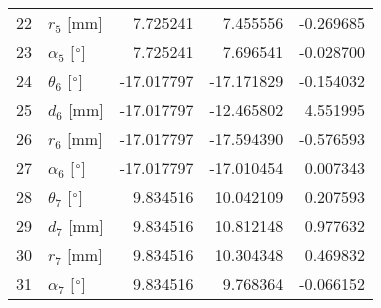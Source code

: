 \documentclass{standalone}%
\begin{document}
\begin{tabular}{llrrr}
22 &              $r_{5}$ [mm] &   7.725241 &   7.455556 &  -0.269685 \\
23 &  $\alpha_{5}$ [$\degree$] &   7.725241 &   7.696541 &  -0.028700 \\
24 &  $\theta_{6}$ [$\degree$] & -17.017797 & -17.171829 &  -0.154032 \\
25 &              $d_{6}$ [mm] & -17.017797 & -12.465802 &   4.551995 \\
26 &              $r_{6}$ [mm] & -17.017797 & -17.594390 &  -0.576593 \\
27 &  $\alpha_{6}$ [$\degree$] & -17.017797 & -17.010454 &   0.007343 \\
28 &  $\theta_{7}$ [$\degree$] &   9.834516 &  10.042109 &   0.207593 \\
29 &              $d_{7}$ [mm] &   9.834516 &  10.812148 &   0.977632 \\
30 &              $r_{7}$ [mm] &   9.834516 &  10.304348 &   0.469832 \\
31 &  $\alpha_{7}$ [$\degree$] &   9.834516 &   9.768364 &  -0.066152 \\
\bottomrule
\end{tabular}
%
\end{document}
